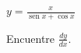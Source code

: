 \item $\displaystyle y = \frac{x}{\operatorname{sen} x + \cos x}$
\par
Encuentre $\displaystyle \frac{dy}{dx}$.

